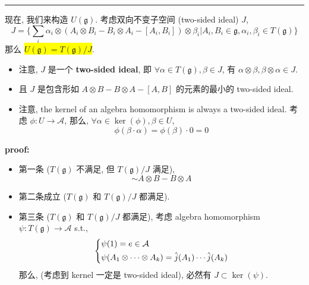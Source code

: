 \begin{itemize}
\begin{tcolorbox}[title=proof:]
		\noindent\rule[0.5ex]{\linewidth}{0.5pt} %
		
		现在, 我们来构造 $U(\mathfrak{g})$. 考虑双向不变子空间 (two-sided ideal) $J$,
		\begin{equation}
			J = \Big\{ \sum_i \alpha_i \otimes (A_i \otimes B_i - B_i \otimes A_i - [A_i, B_i]) \otimes \beta_i \Big| A_i, B_i \in \mathfrak{g}, \alpha_i, \beta_i \in T(\mathfrak{g}) \Big\}
		\end{equation}
		那么 \colorbox{yellow}{$U(\mathfrak{g}) = T(\mathfrak{g}) / J$}.
		\begin{itemize}
			\item 注意, $J$ 是一个 \textbf{two-sided ideal}, 即 $\forall \alpha \in T(\mathfrak{g}), \beta \in J$, 有 $\alpha \otimes \beta, \beta \otimes \alpha \in J$.
			
			\item 且 $J$ 是包含形如 $A \otimes B - B \otimes A - [A, B]$ 的元素的最小的 two-sided ideal.
			
			\item 注意, the kernel of an algebra homomorphism is always a two-sided ideal. 考虑 $\phi : U \rightarrow \mathcal{A}$, 那么, $\forall \alpha \in \ker(\phi), \beta \in U$,
			\begin{equation}
				\phi(\beta \cdot \alpha) = \phi(\beta) \cdot 0 = 0
			\end{equation}
		\end{itemize}
		
		\noindent\hdashrule[0.5ex]{\linewidth}{0.5pt}{1mm} %
		
		\textbf{proof:}
		
		\begin{itemize}
			\item 第一条 ($T(\mathfrak{g})$ 不满足, 但 $T(\mathfrak{g}) / J$ 满足),
			\begin{equation}
				[A, B] \sim A \otimes B - B \otimes A
			\end{equation}
			
			\item 第二条成立 ($T(\mathfrak{g})$ 和 $T(\mathfrak{g}) / J$ 都满足).
			
			\item 第三条 ($T(\mathfrak{g})$ 和 $T(\mathfrak{g}) / J$ 都满足), 考虑 algebra homomorphism $\psi : T(\mathfrak{g}) \rightarrow \mathcal{A}$ s.t.,
			\begin{equation}
				\begin{dcases}
					\psi(1) = e \in \mathcal{A} \\
					\psi(A_1 \otimes \cdots \otimes A_k) = \hat{j}(A_1) \cdots \hat{j}(A_k)
				\end{dcases}
			\end{equation}
			那么, (考虑到 kernel 一定是 two-sided ideal), 必然有 $J \subset \ker(\psi)$.
			

\end{itemize}
\end{tcolorbox}
\end{itemize}
